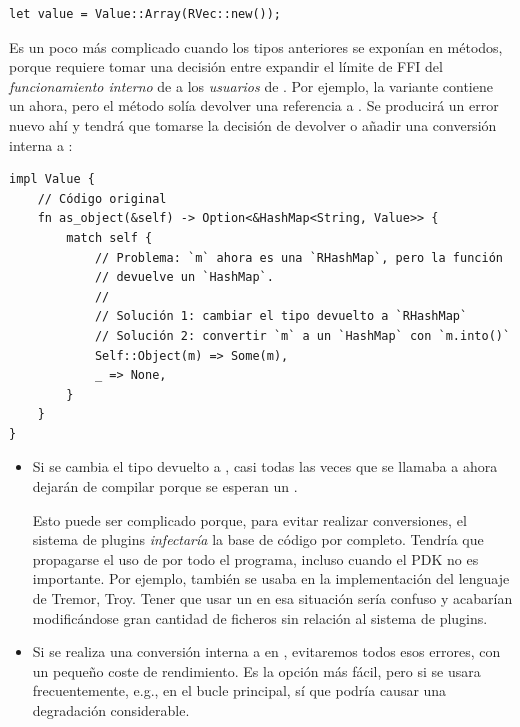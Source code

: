 \begin{verbatim}
let value = Value::Array(RVec::new());
\end{verbatim}

Es un poco más complicado cuando los tipos anteriores se exponían en métodos,
porque requiere tomar una decisión entre expandir el límite de FFI del
\emph{funcionamiento interno} de  a los \emph{usuarios} de
. Por ejemplo, la variante  contiene un
 ahora, pero el método  solía devolver una
referencia a . Se producirá un error nuevo ahí y tendrá que
tomarse la decisión de devolver  o añadir una conversión interna
a :

\begin{verbatim}
impl Value {
    // Código original
    fn as_object(&self) -> Option<&HashMap<String, Value>> {
        match self {
            // Problema: `m` ahora es una `RHashMap`, pero la función
            // devuelve un `HashMap`.
            //
            // Solución 1: cambiar el tipo devuelto a `RHashMap`
            // Solución 2: convertir `m` a un `HashMap` con `m.into()`
            Self::Object(m) => Some(m),
            _ => None,
        }
    }
}
\end{verbatim}

\begin{itemize}
    \item Si se cambia el tipo devuelto a , casi todas las veces
        que se llamaba a  ahora dejarán de compilar porque se
        esperan un .

        Esto puede ser complicado porque, para evitar realizar conversiones, el
        sistema de plugins \emph{infectaría} la base de código por completo.
        Tendría que propagarse el uso de  por todo el programa,
        incluso cuando el PDK no es importante. Por ejemplo, 
        también se usaba en la implementación del lenguaje de Tremor, Troy.
        Tener que usar un  en esa situación sería confuso y
        acabarían modificándose gran cantidad de ficheros sin relación al
        sistema de plugins.

    \item Si se realiza una conversión interna a  en
        , evitaremos todos esos errores, con un pequeño coste de
        rendimiento. Es la opción más fácil, pero si  se
        usara frecuentemente, e.g., en el bucle principal, sí que podría causar
        una degradación considerable.
\end{itemize}

